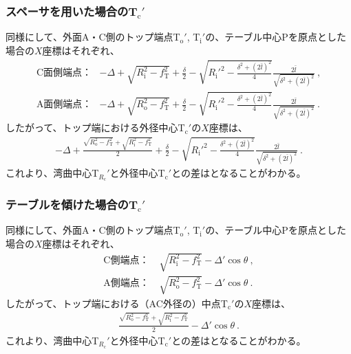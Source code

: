 \subsubsection{スペーサを用いた場合のT\texorpdfstring{$_\mathrm c'$}{c'}}
同様にして、外面A・C側のトップ端点T$_\mathrm o'$, T$_\mathrm i'$の、テーブル中心Pを原点とした場合の$X$座標はそれぞれ、
\begin{align*}
  \text{C面側端点：}&
  -\varDelta+\sqrt{R_\mathrm i^2-f_\mathrm T^2}+\frac\delta2
  -\sqrt{R_\mathrm i'^2-\frac{\delta^2+(2\bar l)^2}4}\frac{2\bar l}{\sqrt{\delta^2+(2\bar l)^2}}\ ,\\
  \text{A面側端点：}&
  -\varDelta+\sqrt{R_\mathrm o^2-f_\mathrm T^2}+\frac\delta2
  -\sqrt{R_\mathrm i'^2-\frac{\delta^2+(2\bar l)^2}4}\frac{2\bar l}{\sqrt{\delta^2+(2\bar l)^2}}\ .
\end{align*}
したがって、トップ端における外径中心T$_\mathrm c'$の$X$座標は、
\begin{align}
  \label{eq:spacerTc}
  -\varDelta+\frac{\sqrt{R_\mathrm o^2-f_\mathrm T^2}+\sqrt{R_\mathrm i^2-f_\mathrm T^2}}2
  +\frac\delta2-\sqrt{R_\mathrm i'^2-\frac{\delta^2+(2\bar l)^2}4}\frac{2\bar l}{\sqrt{\delta^2+(2\bar l)^2}}\ .
\end{align}
これより、湾曲中心T$_{R_\mathrm c}'$と外径中心T$_\mathrm c'$との差はとなることがわかる。


\subsubsection{テーブルを傾けた場合のT\texorpdfstring{$_\mathrm c'$}{c'}}
同様にして、外面A・C側のトップ端点T$_\mathrm o'$, T$_\mathrm i'$の、テーブル中心Pを原点とした場合の$X$座標はそれぞれ、
\begin{align*}
  \text{C側端点：}&~
  \sqrt{R_\mathrm i^2-f_\mathrm T^2}-\varDelta'\cos\theta\ ,\\
  \text{A側端点：}&~
  \sqrt{R_\mathrm o^2-f_\mathrm T^2}-\varDelta'\cos\theta\ .
\end{align*}
したがって、トップ端における（AC外径の）中点T$_\mathrm c'$の$X$座標は、
\begin{align}
  \label{eq:tableTc}
  \frac{\sqrt{R_\mathrm o^2-f_\mathrm T^2}+\sqrt{R_\mathrm i^2-f_\mathrm T^2}}2-\varDelta'\cos\theta\ .
\end{align}
これより、湾曲中心T$_{R_\mathrm c}'$と外径中心T$_\mathrm c'$との差はとなることがわかる。




